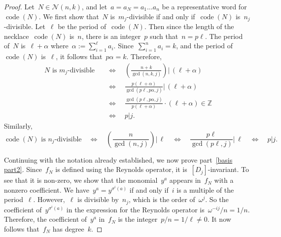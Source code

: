 \documentclass{amsart}
\DeclareMathOperator{\code}{code}
\newcommand{\Z}{\mathbb{Z}}
\newcommand{\neck}{\mathcal{N}}
\begin{document}
\begin{proof}
Let~$N\in\neck(n,k)$, and let~$a=a_N=a_1\dots a_n$ be a representative word
for $\code(N)$.  We first show that~$N$ is~$m_j$-divisible if and only
if~$\code(N)$ is~$n_j$-divisible.  Let~$\ell$ be the period of~$\code(N)$.  Then since
the length of the necklace~$\code(N)$ is~$n$, there is an integer~$p$ such
that~$n=p\ell$.  The period of~$N$ is~$\ell+\alpha$
where~$\alpha:=\sum_{i=1}^{\ell}a_i$.  Since~$\sum_{i=1}^{n}a_i=k$, and the
period of~$\code(N)$ is~$\ell$, it follows that~$p\alpha=k$.  Therefore,
\begin{align*}
  \text{$N$ is~$m_j$-divisible}&\quad\Longleftrightarrow\quad
  \left( \frac{n+k}{\gcd(n,k,j)}\right)\bigg|\,(\ell+\alpha)\\[8pt]
  &\quad\Longleftrightarrow\quad\frac{p(\ell+\alpha)}{\gcd(p\ell,p\alpha,j)}\bigg|\,(\ell+\alpha)\\[8pt]
   &\quad\Longleftrightarrow\quad \frac{\gcd(p\ell,p\alpha,j)}{p(\ell+\alpha)}\cdot(\ell+\alpha)\in\Z\\[8pt]
   &\quad\Longleftrightarrow\quad p|j.
\end{align*}
Similarly,
\[
  \text{$\code(N)$ is~$n_j$-divisible}
  \quad \Leftrightarrow\quad\left( \frac{n}{\gcd(n,j)} \right)\bigg|\,\ell
  \quad\Leftrightarrow\quad\frac{p\ell}{\gcd(p\ell,j)}\bigg|\,\ell
  \quad\Leftrightarrow\quad p|j.
\]

Continuing with the notation already established, we now prove part~\ref{basis
part2}.  Since~$f_N$ is defined using the Reynolds operator, it
is~$[D_j]$-invariant. To see that it is non-zero, we show that the
monomial~$y^a$ appears in~$f_N$ with a nonzero coefficient. We
have~$y^a=y^{\sigma^i(a)}$ if and only if~$i$ is a multiple of the
period~$\ell$.  However,~$\ell$ is divisible by~$n_j$, which is the order
of~$\omega^{j}$.  So the coefficient of~$y^{\sigma^i(a)}$ in the expression for
the Reynolds operator is~$\omega^{-ij}/n=1/n$.  Therefore, the coefficient
of~$y^{a}$ in~$f_N$ is the integer~$p/n=1/\ell\neq0$.  It now follows that~$f_N$
has degree~$k$.


\end{proof}
\end{document}

